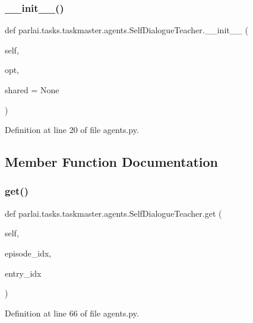 \subsubsection{\texorpdfstring{\+\_\+\+\_\+init\+\_\+\+\_\+()}{\_\_init\_\_()}}
{\footnotesize\ttfamily def parlai.\+tasks.\+taskmaster.\+agents.\+Self\+Dialogue\+Teacher.\+\_\+\+\_\+init\+\_\+\+\_\+ (\begin{DoxyParamCaption}\item[{}]{self,  }\item[{}]{opt,  }\item[{}]{shared = {\ttfamily None} }\end{DoxyParamCaption})}



Definition at line 20 of file agents.\+py.



\subsection{Member Function Documentation}
\mbox{\label{classparlai_1_1tasks_1_1taskmaster_1_1agents_1_1SelfDialogueTeacher_a328edd2f9d9681f6e1671b91c81046e5}} 
\subsubsection{\texorpdfstring{get()}{get()}}
{\footnotesize\ttfamily def parlai.\+tasks.\+taskmaster.\+agents.\+Self\+Dialogue\+Teacher.\+get (\begin{DoxyParamCaption}\item[{}]{self,  }\item[{}]{episode\+\_\+idx,  }\item[{}]{entry\+\_\+idx }\end{DoxyParamCaption})}



Definition at line 66 of file agents.\+py.




